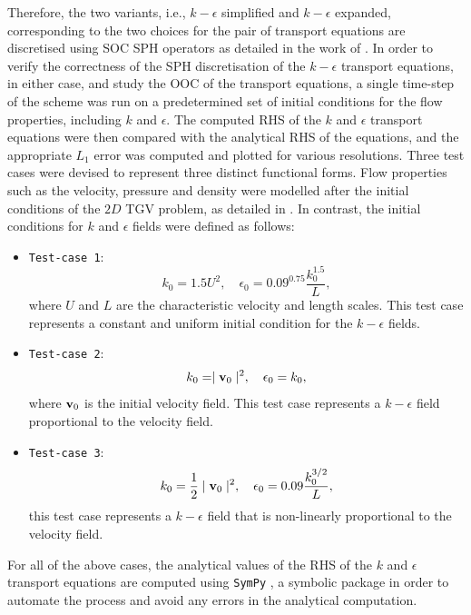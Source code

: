 Therefore, the two variants, i.e., $k-\epsilon$ simplified and $k-\epsilon$ expanded, corresponding to the two choices for the pair of transport equations are discretised using SOC SPH operators as detailed in the work of \cite{Negi2022Techniques}.
In order to verify the correctness of the SPH discretisation of the $k-\epsilon$ transport equations, in either case, and study the OOC of the transport equations, a single time-step of the scheme was run on a predetermined set of initial conditions for the flow properties, including $k$ and $\epsilon$. The computed RHS of the $k$ and $\epsilon$ transport equations were then compared with the analytical RHS of the equations, and the appropriate $L_1$ error was computed and plotted for various resolutions.
Three test cases were devised to represent three distinct functional forms. Flow properties such as the velocity, pressure and density were modelled after the initial conditions of the $2D$ TGV problem, as detailed in . In contrast, the initial conditions for $k$ and $\epsilon$ fields were defined as follows:
\begin{itemize}
  \item \texttt{Test-case 1}:
  \begin{equation}
    k_0 = 1.5 U^2, \quad \epsilon_0 = 0.09^{0.75} \frac{k_0^{1.5}}{L},
  \end{equation}
  where $U$ and $L$ are the characteristic velocity and length scales. This test case represents a constant and uniform initial condition for the $k-\epsilon$ fields.

  \item \texttt{Test-case 2}:
  \begin{equation}
    k_0 = \mid \mathbf{v}_0 \mid^2, \quad \epsilon_0 = k_0,
  \end{equation}
  where $\mathbf{v}_0$ is the initial velocity field. This test case represents a $k-\epsilon$ field proportional to the velocity field.

  \item \texttt{Test-case 3}:
  \begin{equation}
    k_0 = \frac{1}{2}\mid \mathbf{v}_0 \mid^2, \quad \epsilon_0 = 0.09 \frac{k_0^{3/2}}{L},
  \end{equation}
  this test case represents a $k-\epsilon$ field that is non-linearly proportional to the velocity field.
\end{itemize}
For all of the above cases, the analytical values of the RHS of the $k$ and $\epsilon$ transport equations are computed using \texttt{SymPy} \parencite{Meurer2017}, a symbolic package in order to automate the process and avoid any errors in the analytical computation.

